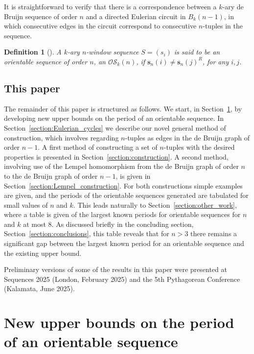 \documentclass[a4paper,11pt]{article}
\newtheorem{definition}[lemma]{Definition}
\begin{document}
It is straightforward to verify that there is a correspondence between a $k$-ary de Bruijn
sequence
of order $n$ and a directed Eulerian circuit in $B_{k}(n-1)$, in which consecutive edges in the
circuit correspond to consecutive $n$-tuples in the sequence.

\begin{definition}[\cite{Alhakim24a}] A $k$-ary $n$-window sequence $S = (s_i)$ is
said to be an \emph{orientable sequence of order $n$}, an $\mathcal{OS}_k(n)$, if $\mathbf{s}_n(i)
\neq \mathbf{s}_n(j)^R$, for any $i,j$.
\end{definition}

\subsection{This paper}

The remainder of this paper is structured as follows.  We start, in
Section~\ref{section:upper_bound}, by developing new upper bounds on the period of an orientable
sequence. In Section~\ref{section:Eulerian_cycles} we describe our novel general method of
construction, which involves regarding $n$-tuples as edges in the de Bruijn graph of order $n-1$. A
first method of constructing a set of $n$-tuples with the desired properties is presented in
Section~\ref{section:construction}.  A second method, involving use of the Lempel homomorphism from
the de Bruijn graph of order $n$ to the de Bruijn graph of order $n-1$, is given in
Section~\ref{section:Lempel_construction}. For both constructions simple examples are given, and
the periods of the orientable sequences generated are tabulated for small values of $n$ and $k$.
This leads naturally to Section~\ref{section:other_work}, where a table is given of the largest
known periods for orientable sequences for $n$ and $k$ at most 8.  As discussed briefly in the
concluding section, Section~\ref{section:conclusions}, this table reveals that for $n>3$ there
remains a significant gap between the largest known period for an orientable sequence and the
existing upper bound.

Preliminary versions of some of the results in this paper were presented at Sequences 2025 (London,
February 2025) and the 5th Pythagorean Conference (Kalamata, June 2025).

\section{New upper bounds on the period of an orientable sequence}  \label{section:upper_bound}
\end{document}
